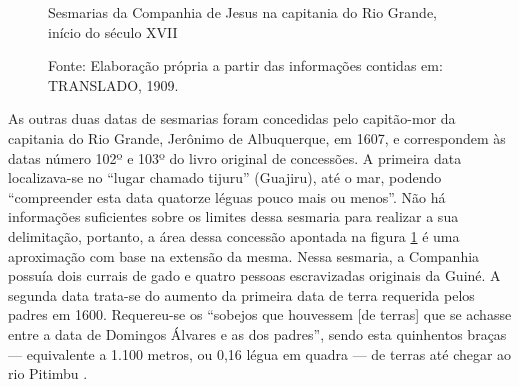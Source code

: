 \begin{refsection}
\begin{figure}[ht]%
    \centering%
    \caption{Sesmarias da Companhia de Jesus na capitania do Rio Grande, início do século XVII}%
    \caption*{Fonte: Elaboração própria a partir das informações contidas em: TRANSLADO, 1909.}%
    \label{fig:fig01}%
\end{figure}%

As outras duas datas de sesmarias foram concedidas pelo capitão-mor da capitania do Rio Grande, Jerônimo de Albuquerque, em 1607, e correspondem às datas número 102º e 103º do livro original de concessões. A primeira data localizava-se no “lugar chamado tijuru” (Guajiru), até o mar, podendo “compreender esta data quatorze léguas pouco mais ou menos”. Não há informações suficientes sobre os limites dessa sesmaria para realizar a sua delimitação, portanto, a área dessa concessão apontada na figura \ref{fig:fig01} é uma aproximação com base na extensão da mesma. Nessa sesmaria, a Companhia possuía dois currais de gado e quatro pessoas escravizadas originais da Guiné. A segunda data trata-se do aumento da primeira data de terra requerida pelos padres em 1600. Requereu-se os “sobejos que houvessem [de terras] que se achasse entre a data de Domingos Álvares e as dos padres”, sendo esta quinhentos braças --- equivalente a 1.100 metros, ou 0,16 légua em quadra --- de terras até chegar ao rio Pitimbu \cite[p.~49--51]{Translado1909}. 


\end{refsection}
